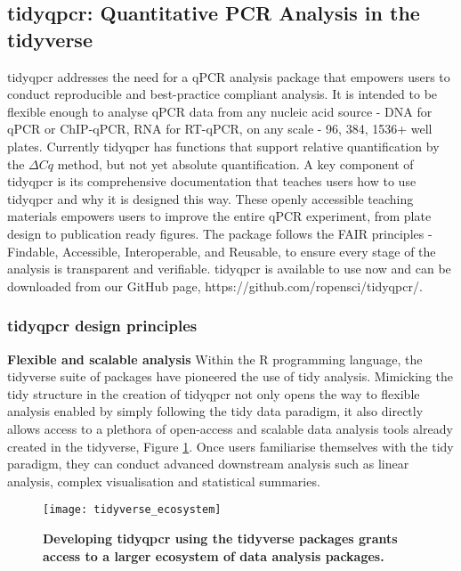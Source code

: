 \documentclass[../main.tex]{subfiles}
\begin{document}
\subsection{tidyqpcr: Quantitative PCR Analysis in the tidyverse}

tidyqpcr addresses the need for a qPCR analysis package that empowers users to conduct reproducible and best-practice compliant analysis.
It is intended to be flexible enough to analyse qPCR data from any nucleic acid source - DNA for qPCR or ChIP-qPCR, RNA for RT-qPCR, on any scale - 96, 384, 1536+ well plates.
Currently tidyqpcr has functions that support relative quantification by the $\Delta Cq$ method, but not yet absolute quantification.
A key component of tidyqpcr is its comprehensive documentation that teaches users how to use tidyqpcr and why it is designed this way.
These openly accessible teaching materials empowers users to improve the entire qPCR experiment, from plate design to publication ready figures.
The package follows the FAIR principles - Findable, Accessible, Interoperable, and Reusable, to ensure every stage of the analysis is transparent and verifiable. 
tidyqpcr is available to use now and can be downloaded from our GitHub page, https://github.com/ropensci/tidyqpcr/.


\subsubsection{tidyqpcr design principles}


\textbf{Flexible and scalable analysis} Within the R programming language, the tidyverse suite of packages have pioneered the use of tidy analysis. 
Mimicking the tidy structure in the creation of tidyqpcr not only opens the way to flexible analysis enabled by simply following the tidy data paradigm, it also directly allows access to a plethora of open-access and scalable data analysis tools already created in the tidyverse, Figure \ref{fig:tidyverse-ecosystem}. 
Once users familiarise themselves with the tidy paradigm, they can conduct advanced downstream analysis such as linear analysis, complex visualisation and statistical summaries. 

\begin{figure}[t]

{\centering \texttt{[image: tidyverse\_ecosystem]} 

}

\caption[Developing tidyqpcr using the tidyverse packages grants access to a larger ecosystem of data analysis packages.]{\textbf{Developing tidyqpcr using the tidyverse packages grants access to a larger ecosystem of data analysis packages.}}\label{fig:tidyverse-ecosystem}
\end{figure}
\end{document}
